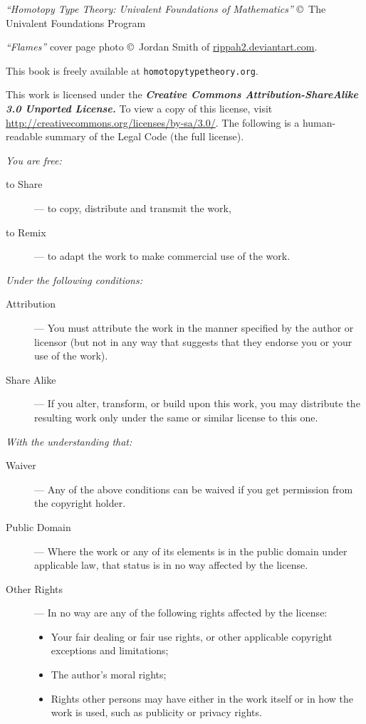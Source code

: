 {\footnotesize
\noindent
\emph{``Homotopy Type Theory: Univalent Foundations of Mathematics''}
\copyright\ The Univalent Foundations Program

\bigskip

\noindent
\emph{``Flames''} cover page photo
\copyright\ Jordan Smith of \href{http://rippah2.deviantart.com/}{rippah2.deviantart.com}.

\bigskip

\noindent
This book is freely available at
{\tt homotopytypetheory.org}.
%

\bigskip

\noindent
This work is licensed under the
\textbf{\emph{Creative Commons Attribution-ShareAlike 3.0 Unported License.}}
%
To view a copy of this license, visit
\href{http://creativecommons.org/licenses/by-sa/3.0/}{http://creativecommons.org/licenses/by-sa/3.0/}.
The following is a human-readable summary of the Legal Code (the full license).

\bigskip

\noindent
\emph{You are free:}
%
\begin{description}
\item[to Share] --- to copy, distribute and transmit the work,
\item[to Remix] --- to adapt the work to make commercial use of the work.
\end{description}
%
\emph{Under the following conditions:}
%
\begin{description}

\item[Attribution] --- You must attribute the work in the manner specified by the author
  or licensor (but not in any way that suggests that they endorse you or your use of the
  work).

\item[Share Alike] --- If you alter, transform, or build upon this work, you may
  distribute the resulting work only under the same or similar license to this one.
\end{description}
%
\emph{With the understanding that:}
\begin{description}

\item[Waiver] --- Any of the above conditions can be waived if you get permission from the
  copyright holder.

\item[Public Domain] --- Where the work or any of its elements is in the public domain
  under applicable law, that status is in no way affected by the license.

\item[Other Rights] --- In no way are any of the following rights affected by the license:
  \begin{itemize}
  \item Your fair dealing or fair use rights, or other applicable copyright exceptions and
    limitations;
  \item The author's moral rights;
  \item Rights other persons may have either in the work itself or in how the work is
    used, such as publicity or privacy rights.
  \end{itemize}
\end{description}
}
\cleardoublepage

\restoregeometry

\pagestyle{fancyplain}

